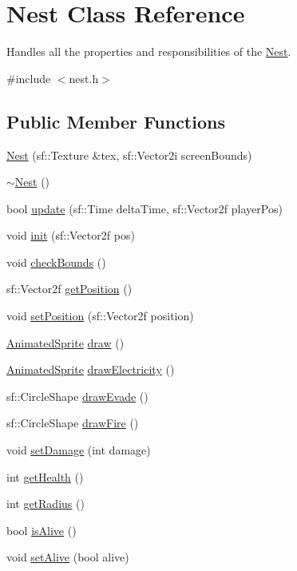 \hypertarget{class_nest}{}\section{Nest Class Reference}
\label{class_nest}


Handles all the properties and responsibilities of the \hyperlink{class_nest}{Nest}.  




{\ttfamily \#include $<$nest.\+h$>$}

\subsection*{Public Member Functions}
\begin{DoxyCompactItemize}
\item 
\hyperlink{class_nest_af88d2bfa6f9d0b0c48982ff54fe31cf9}{Nest} (sf\+::\+Texture \&tex, sf\+::\+Vector2i screen\+Bounds)
\item 
\hyperlink{class_nest_a3e879ba15acd31717b1dc9bdc87488d5}{$\sim$\+Nest} ()
\item 
bool \hyperlink{class_nest_a90efe6e30a891f7dd0620d4f14c3cef6}{update} (sf\+::\+Time delta\+Time, sf\+::\+Vector2f player\+Pos)
\item 
void \hyperlink{class_nest_a1b243050144c8b5200bd3e8a4370565a}{init} (sf\+::\+Vector2f pos)
\item 
void \hyperlink{class_nest_ad3c58a10bcb55df97a6d0e7923924f0b}{check\+Bounds} ()
\item 
sf\+::\+Vector2f \hyperlink{class_nest_a3904c58d1826997b98bdfd8b357ba6fa}{get\+Position} ()
\item 
void \hyperlink{class_nest_a483c559f957838c28d613fddad8b99f3}{set\+Position} (sf\+::\+Vector2f position)
\item 
\hyperlink{class_animated_sprite}{Animated\+Sprite} \hyperlink{class_nest_a6e4950498b1c767c513e1a5fac4259e5}{draw} ()
\item 
\hyperlink{class_animated_sprite}{Animated\+Sprite} \hyperlink{class_nest_ad90f39c39a435c3cb2702880b624d254}{draw\+Electricity} ()
\item 
sf\+::\+Circle\+Shape \hyperlink{class_nest_a69a224e6296dadbeee744697d308259c}{draw\+Evade} ()
\item 
sf\+::\+Circle\+Shape \hyperlink{class_nest_a3118b2257f6864632abf907c42af94fd}{draw\+Fire} ()
\item 
void \hyperlink{class_nest_a2a5904049fbb094af9f79ec55a5be9d6}{set\+Damage} (int damage)
\item 
int \hyperlink{class_nest_a31a181f820acdcc53c5c0954ec57bdd2}{get\+Health} ()
\item 
int \hyperlink{class_nest_a83653533eadad995b464a8a068257fe8}{get\+Radius} ()
\item 
bool \hyperlink{class_nest_a3f0d0175e349409ef2cab7e9bae0fb81}{is\+Alive} ()
\item 
void \hyperlink{class_nest_a122840333f4f0d0f5acd2815b0f633ca}{set\+Alive} (bool alive)
\end{DoxyCompactItemize}


